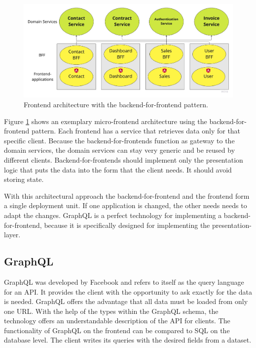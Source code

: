 \documentclass[MSE,Master,english]{twbook}%
\begin{document}
\ifshowImages
\begin{figure}[H]
\centering
\includegraphics[width=0.8\linewidth]{images/ui-bff-architecture.jpg}
\caption{Frontend architecture with the backend-for-frontend pattern.}\label{figure:state-of-the-art:ui-bff-architecture}
\end{figure}
\fi

Figure \ref{figure:state-of-the-art:ui-bff-architecture} shows an exemplary micro-frontend architecture using the backend-for-frontend pattern. Each frontend has a service that retrieves data only for that specific client. Because the backend-for-frontends function as gateway to the domain services, the domain services can stay very generic and be reused by different clients. Backend-for-frontends should implement only the presentation logic that puts the data into the form that the client needs. It should avoid storing state. \cite{misc:2019:leitner:backend-for-frontends}

With this architectural approach the backend-for-frontend and the frontend form a single deployment unit. If one application is changed, the other needs needs to adapt the changes. GraphQL is a perfect technology for implementing a backend-for-frontend, because it is specifically designed for implementing the presentation-layer.

\subsection{GraphQL}

GraphQL was developed by Facebook and refers to itself as the query language for an API. It provides the client with the opportunity to ask exactly for the data is needed. GraphQL offers the advantage that all data must be loaded from only one URL. With the help of the types within the GraphQL schema, the technology offers an understandable description of the
API for clients. \cite{misc:-:graphql-org} The functionality of GraphQL on the frontend can be compared to SQL on the database level. The client writes its queries with the desired fields from a dataset.
\end{document}
